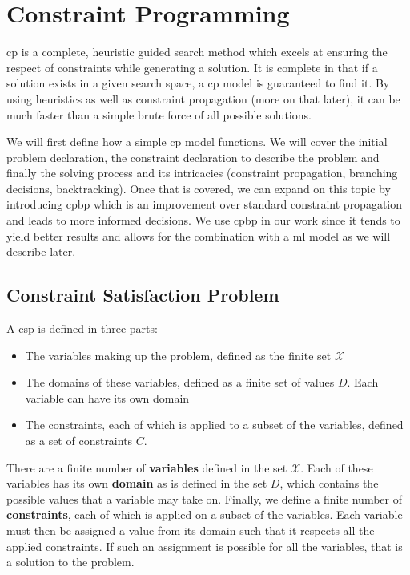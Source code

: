 \documentclass[../Document.tex]{subfiles}
\begin{document}
\section{Constraint Programming}
\label{sec:intro/cp}
\acrlong{cp} is a complete, heuristic guided search method which excels at ensuring the respect of constraints while generating a solution. It is complete in that if a solution exists in a given search space, a \gls{cp} model is guaranteed to find it. By using heuristics as well as constraint propagation (more on that later), it can be much faster than a simple brute force of all possible solutions.

We will first define how a simple \gls{cp} model functions. We will cover the initial problem declaration, the constraint declaration to describe the problem and finally the solving process and its intricacies (constraint propagation, branching decisions, backtracking).
Once that is covered, we can expand on this topic by introducing \gls{cpbp}
which is an improvement over standard constraint propagation and leads to more informed decisions. We use \gls{cpbp} in our work since it tends to yield better results and allows for the combination with a \gls{ml} model as we will describe later.

\subsection{Constraint Satisfaction Problem}
A \gls{csp} is defined in three parts:
\begin{itemize}
    \item The variables making up the problem, defined as the finite set $\mathcal{X}$
    \item The domains of these variables, defined as a finite set of values $D$. Each variable can have its own domain
    \item The constraints, each of which is applied to a subset of the variables, defined as a set of constraints $C$.
\end{itemize}

There are a finite number of \textbf{variables} defined in the set $\mathcal{X}$. Each of these variables has its own \textbf{domain} as is defined in the set $D$, which contains the possible values that a variable may take on. Finally, we define a finite number of \textbf{constraints}, each of which is applied on a subset of the variables. Each variable must then be assigned a value from its domain such that it respects all the applied constraints. If such an assignment is possible for all the variables, that is a solution to the problem.
\end{document}
